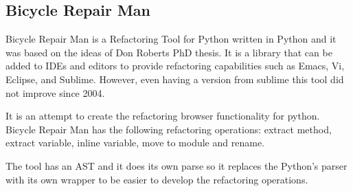 
\subsection{Bicycle Repair Man}

Bicycle Repair Man is a Refactoring Tool for Python written in Python and it was based on the ideas of Don Roberts PhD thesis. It is a library that can be added to IDEs and editors to provide refactoring capabilities such as Emacs, Vi, Eclipse, and Sublime. However, even having a version from sublime this tool did not improve since 2004.

It is an attempt to create the refactoring browser functionality for python. Bicycle Repair Man has the following refactoring operations:
extract method, extract variable, inline variable, move to module and rename.

The tool has an AST and it does its own parse so it replaces the Python's parser with its own wrapper to be easier to develop the refactoring operations.


